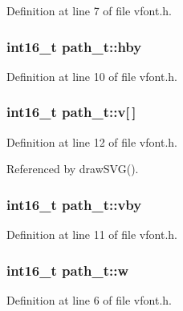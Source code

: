 Definition at line 7 of file vfont.\+h.

\subsubsection[{\texorpdfstring{hby}{hby}}]{\setlength{\rightskip}{0pt plus 5cm}int16\+\_\+t path\+\_\+t\+::hby}\hypertarget{structpath__t_ab2a7d0842a1706edb85f5bef4300a059}{}\label{structpath__t_ab2a7d0842a1706edb85f5bef4300a059}


Definition at line 10 of file vfont.\+h.

\subsubsection[{\texorpdfstring{v}{v}}]{\setlength{\rightskip}{0pt plus 5cm}int16\+\_\+t path\+\_\+t\+::v\mbox{[}$\,$\mbox{]}}\hypertarget{structpath__t_aea933e3d574931ef4c35386a2b2b8c03}{}\label{structpath__t_aea933e3d574931ef4c35386a2b2b8c03}


Definition at line 12 of file vfont.\+h.



Referenced by draw\+S\+V\+G().

\subsubsection[{\texorpdfstring{vby}{vby}}]{\setlength{\rightskip}{0pt plus 5cm}int16\+\_\+t path\+\_\+t\+::vby}\hypertarget{structpath__t_a3e3a916459dda0710dd252e541fbd372}{}\label{structpath__t_a3e3a916459dda0710dd252e541fbd372}


Definition at line 11 of file vfont.\+h.

\subsubsection[{\texorpdfstring{w}{w}}]{\setlength{\rightskip}{0pt plus 5cm}int16\+\_\+t path\+\_\+t\+::w}\hypertarget{structpath__t_a8977017efd250c8fd0eb168f44c618eb}{}\label{structpath__t_a8977017efd250c8fd0eb168f44c618eb}


Definition at line 6 of file vfont.\+h.

